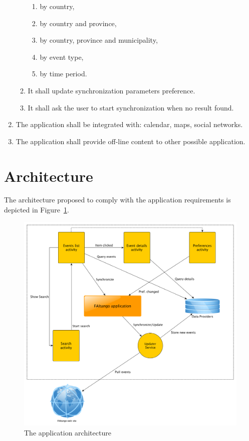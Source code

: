 \documentclass[10pt, twoside]{article}
\begin{document}
\begin{enumerate}
\begin{enumerate}
			\begin{enumerate}
				\item by country,
				\item	by country and province,
				\item	by country, province and municipality,
				\item by event type,
				\item by time period.
			\end{enumerate}
			\item It shall update synchronization parameters preference.
			\item	It shall ask the user to start synchronization when no result found.
    		\end{enumerate}
    	\item The application shall be integrated with: calendar, maps, social networks.
    	\item The application shall provide off-line content to other possible application.
\end{enumerate}

\section{Architecture}

The architecture proposed to comply with the application requirements
is depicted in Figure~\ref{fig:apparc}. 

\begin{figure}[h]
\begin{center}
\includegraphics[scale=0.39]{fig/app_structure.png}
\end{center}
\caption{The application architecture}
\label{fig:apparc}
\end{figure}
\end{document}
